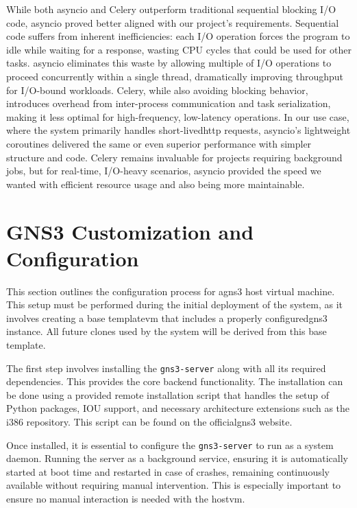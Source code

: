         While both asyncio and Celery outperform traditional sequential blocking I/O code, asyncio proved better 
        aligned with our project's requirements. Sequential code suffers from inherent inefficiencies: each I/O 
        operation forces the program to idle while waiting for a response, wasting CPU cycles that could be used 
        for other tasks. asyncio eliminates this waste by allowing multiple of I/O operations to proceed 
        concurrently within a single thread, dramatically improving throughput for I/O-bound workloads. Celery, 
        while also avoiding blocking behavior, introduces overhead from inter-process communication and task 
        serialization, making it less optimal for high-frequency, low-latency operations. In our use case, where the 
        system primarily handles short-lived\ac{http} requests, asyncio's lightweight coroutines delivered the same 
        or even superior performance with simpler structure and code. Celery remains invaluable for projects requiring  
        background jobs, but for real-time, I/O-heavy scenarios, asyncio provided the speed we wanted with efficient resource usage and 
        also being more maintainable.

\section{GNS3 Customization and Configuration}

    This section outlines the configuration process for a\ac{gns3} host virtual machine. This setup must be performed during the initial 
    deployment of the system, as it involves creating a base template\ac{vm} that includes a properly configured\ac{gns3} instance. 
    All future clones used by the system will be derived from this base template.

    The first step involves installing the \texttt{gns3-server} along with all its required dependencies. This provides the 
    core backend functionality. The installation can be done using a provided remote installation script that handles the 
    setup of Python packages, IOU support, and necessary architecture extensions such as the i386 repository. 
    This script can be found on the official\ac{gns3} website.

    Once installed, it is essential to configure the \texttt{gns3-server} to run as a system daemon. Running the server as 
    a background service, ensuring it is automatically started at boot time and restarted in case of crashes, remaining 
    continuously available without requiring manual intervention. This is especially important to ensure no manual interaction 
    is needed with the host\ac{vm}.

